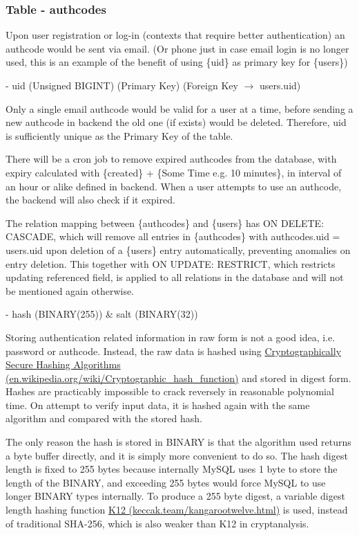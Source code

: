 \documentclass[12pt]{report}
\newcommand{\n}{\par}
\newcommand{\br}{\n\vspace{1 em}\n}
\begin{document}
\subsubsection{Table - authcodes} \label{data-layer.design.user-system.authcodes}
Upon user registration or log-in (contexts that require better authentication) an authcode would be sent via email.
(Or phone just in case email login is no longer used, this is an example of the benefit of using \{uid\} as primary key for \{users\})
\br
- uid (Unsigned BIGINT) (Primary Key) (Foreign Key $\rightarrow$ users.uid)\n
Only a single email authcode would be valid for a user at a time,
before sending a new authcode in backend the old one (if exists) would be deleted.
Therefore, uid is sufficiently unique as the Primary Key of the table.\n
There will be a cron job to remove expired authcodes from the database,
with expiry calculated with \{created\} + \{Some Time e.g. 10 minutes\},
in interval of an hour or alike defined in backend.
When a user attempts to use an authcode, the backend will also check if it expired.\n
The relation mapping between \{authcodes\} and \{users\} has ON DELETE: CASCADE,
which will remove all entries in \{authcodes\} with authcodes.uid = users.uid upon deletion of a \{users\} entry automatically,
preventing anomalies on entry deletion.
This together with ON UPDATE: RESTRICT, which restricts updating referenced field,
is applied to all relations in the database and will not be mentioned again otherwise.
\br
- hash (BINARY(255)) \& salt (BINARY(32))\n
Storing authentication related information in raw form is not a good idea, i.e. password or authcode.
Instead, the raw data is hashed using \href{https://en.wikipedia.org/wiki/Cryptographic_hash_function}{Cryptographically Secure Hashing Algorithms (en.wikipedia.org/wiki/Cryptographic\_hash\_function)} and stored in digest form.
Hashes are practicably impossible to crack reversely in reasonable polynomial time.
On attempt to verify input data, it is hashed again with the same algorithm and compared with the stored hash.\n
The only reason the hash is stored in BINARY is that the algorithm used returns a byte buffer directly, and it is simply more convenient to do so.
The hash digest length is fixed to 255 bytes because internally MySQL uses 1 byte to store the length of the BINARY,
and exceeding 255 bytes would force MySQL to use longer BINARY types internally.
To produce a 255 byte digest, a variable digest length hashing function \href{https://keccak.team/kangarootwelve.html}{K12 (keccak.team/kangarootwelve.html)} is used,
instead of traditional SHA-256, which is also weaker than K12 in cryptanalysis.\n
\end{document}
